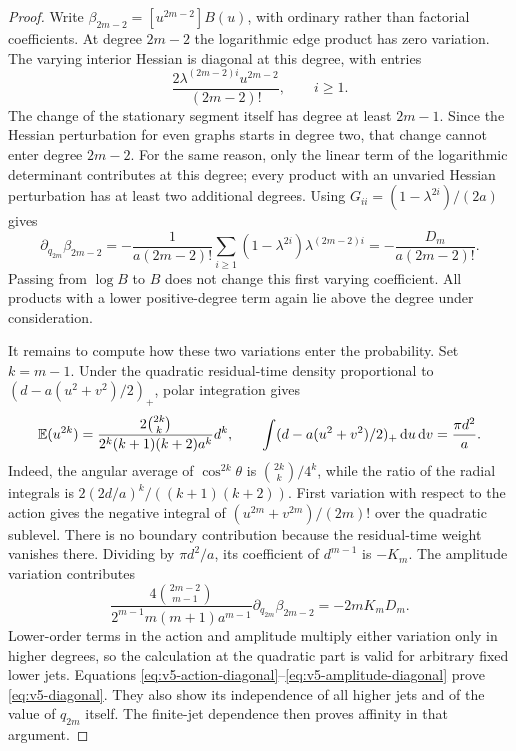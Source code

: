 \begin{proof}
Write $\beta_{2m-2}=[u^{2m-2}]B(u)$, with ordinary rather than factorial
coefficients. At degree $2m-2$ the logarithmic edge product has zero
variation. The varying interior Hessian is diagonal at this degree, with
entries
\[
 \frac{2\lambda^{(2m-2)i}u^{2m-2}}{(2m-2)!},\qquad i\ge1.
\]
The change of the stationary segment itself has degree at least $2m-1$.
Since the Hessian perturbation for even graphs starts in degree two,
that change cannot enter degree $2m-2$. For the same reason, only the
linear term of the logarithmic determinant contributes at this degree;
every product with an unvaried Hessian perturbation has at least two
additional degrees. Using $G_{ii}=(1-\lambda^{2i})/(2a)$ gives
\begin{equation}\label{eq:v5-amplitude-diagonal}
 \partial_{q_{2m}}\beta_{2m-2}
 =-\frac1{a(2m-2)!}
    \sum_{i\ge1}(1-\lambda^{2i})\lambda^{(2m-2)i}
 =-\frac{D_m}{a(2m-2)!}.
\end{equation}
Passing from $\log B$ to $B$ does not change this first varying
coefficient. All products with a lower positive-degree term again lie
above the degree under consideration.

It remains to compute how these two variations enter the probability.
Set $k=m-1$. Under the quadratic residual-time density proportional to
$(d-a(u^2+v^2)/2)_+$, polar integration gives
\begin{equation}\label{eq:v5-moments}
 \mathbb E(u^{2k})=
 \frac{2\binom{2k}{k}}{2^k(k+1)(k+2)a^k}d^k,
 \qquad
 \int(d-a(u^2+v^2)/2)_+\,\mathrm d u\,\mathrm d v=\frac{\pi d^2}{a}.
\end{equation}
Indeed, the angular average of $\cos^{2k}\theta$ is
$\binom{2k}{k}/4^k$, while the ratio of the radial integrals is
$2(2d/a)^k/((k+1)(k+2))$.
First variation with respect to the action gives the negative integral
of $(u^{2m}+v^{2m})/(2m)!$ over the quadratic sublevel. There is no
boundary contribution because the residual-time weight vanishes there.
Dividing by $\pi d^2/a$, its coefficient of $d^{m-1}$ is $-K_m$.
The amplitude variation contributes
\[
 \frac{4\binom{2m-2}{m-1}}{2^{m-1}m(m+1)a^{m-1}}
                  \partial_{q_{2m}}\beta_{2m-2}=-2mK_mD_m.
\]
Lower-order terms in the action and amplitude multiply either variation
only in higher degrees, so the calculation at the quadratic part is
valid for arbitrary fixed lower jets. Equations
\eqref{eq:v5-action-diagonal}--\eqref{eq:v5-amplitude-diagonal} prove
\eqref{eq:v5-diagonal}. They also show its independence of all higher
jets and of the value of $q_{2m}$ itself. The finite-jet dependence then
proves affinity in that argument.


\end{proof}
